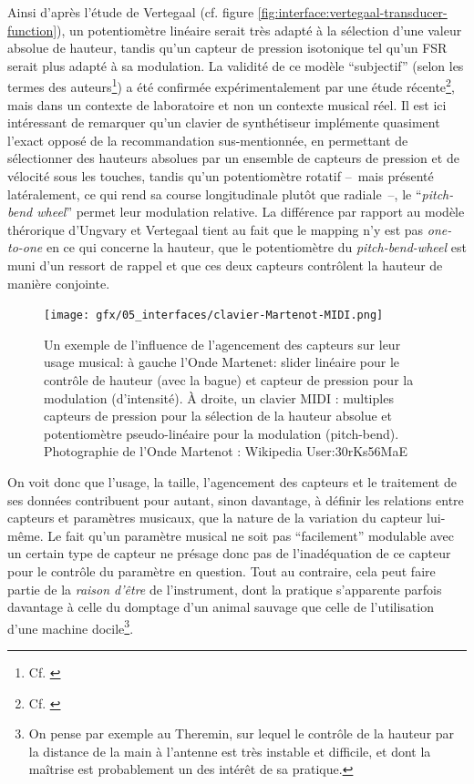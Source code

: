 \indent Ainsi d'après l'étude de Vertegaal (cf. figure \ref{fig:interface:vertegaal-transducer-function}), un potentiomètre linéaire serait très adapté à la sélection d'une valeur absolue de hauteur, tandis qu'un capteur de pression isotonique tel qu'un \gls{FSR} serait plus adapté à sa modulation. La validité de ce modèle ``subjectif'' (selon les termes des auteurs\footnote{Cf. \cite{ungvary_cognition_1999}}) a été confirmée expérimentalement par une étude récente\footnote{Cf. \cite{malloch_design_2019}}, mais dans un contexte de laboratoire et non un contexte musical réel. Il est ici intéressant de remarquer qu'un clavier de synthétiseur implémente quasiment l'exact opposé de la recommandation sus-mentionnée, en permettant de sélectionner des hauteurs absolues par un ensemble de capteurs de pression et de vélocité sous les touches, tandis qu'un potentiomètre rotatif --~mais présenté latéralement, ce qui rend sa course longitudinale plutôt que radiale~--, le ``\textit{pitch-bend wheel}'' permet leur modulation relative. La différence par rapport au modèle thérorique d'Ungvary et Vertegaal tient au fait que le mapping n'y est pas \textit{one-to-one} en ce qui concerne la hauteur, que le potentiomètre du \textit{pitch-bend-wheel} est muni d'un ressort de rappel et que ces deux capteurs contrôlent la hauteur de manière conjointe.\\
\begin{figure}[!htbp]
	\captionsetup{format=plain}%
	\texttt{[image: gfx/05\_interfaces/clavier-Martenot-MIDI.png]}
	\caption[Agencement des capteurs et fonction musicale]{Un exemple de l'influence de l'agencement des capteurs sur leur usage musical: à gauche l'Onde Martenet: slider linéaire pour le contrôle de hauteur (avec la bague) et capteur de pression pour la modulation (d'intensité). À droite, un clavier MIDI : multiples capteurs de pression pour la sélection de la hauteur absolue et potentiomètre pseudo-linéaire pour la modulation (pitch-bend). Photographie de l'Onde Martenot : Wikipedia User:30rKs56MaE}
	\label{fig:interface:martenot-clavier}
\end{figure}
\indent On voit donc que l'usage, la taille, l'agencement des capteurs et le traitement de ses données contribuent pour autant, sinon davantage, à définir les relations entre capteurs et paramètres musicaux, que la nature de la variation du capteur lui-même. Le fait qu'un paramètre musical ne soit pas ``facilement'' modulable avec un certain type de capteur ne présage donc pas de l'inadéquation de ce capteur pour le contrôle du paramètre en question. Tout au contraire, cela peut faire partie de la \textit{raison d'être} de l'instrument, dont la pratique s'apparente parfois davantage à celle du domptage d'un animal sauvage que celle de l'utilisation d'une machine docile\footnote{On pense par exemple au Theremin, sur lequel le contrôle de la hauteur par la distance de la main à l'antenne est très instable et difficile, et dont la maîtrise est probablement un des intérêt de sa pratique.}.


